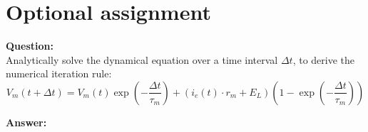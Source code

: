 \documentclass{scrartcl}
\newcommand\Question{%
  \textbf{Question:}%
}
\newcommand\Answer{%
  \textbf{Answer:}%
}
\begin{document}
\section{Optional assignment}

\Question\\
Analytically solve the dynamical equation over a time interval $\Delta t$, to derive the numerical iteration rule:
\begin{equation*}
V_m(t+\Delta t) = V_m(t) \exp\left(-\frac{\Delta t}{\tau_m}\right) + \left(i_e(t) \cdot r_m + E_L \right) \left( 1 - \exp{\left( -\frac{\Delta t}{\tau_m}\right)}\right)
\end{equation*}

\Answer\\
\end{document}
